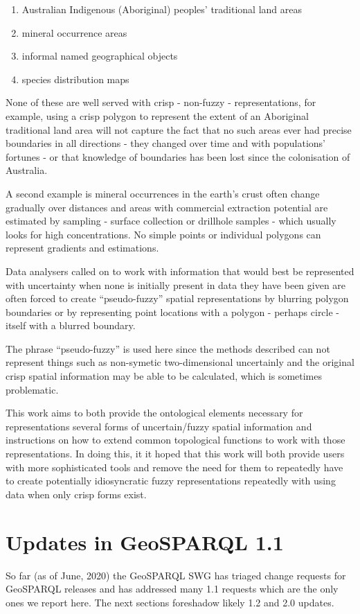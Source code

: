 \documentclass[runningheads]{llncs}
\begin{document}
\begin{enumerate}
    \item Australian Indigenous (Aboriginal) peoples' traditional land areas
    \item mineral occurrence areas
    \item informal named geographical objects
    \item species distribution maps
\end{enumerate}

None of these are well served with crisp - non-fuzzy - representations, for example, using a crisp polygon to represent the extent of an Aboriginal traditional land area will not capture the fact that no such areas ever had precise boundaries in all directions - they changed over time and with populations' fortunes - or that knowledge of boundaries has been lost since the colonisation of Australia.

A second example is mineral occurrences in the earth's crust often change gradually over distances and areas with commercial extraction potential are estimated by sampling - surface collection or drillhole samples - which usually looks for high concentrations. No simple points or individual polygons can represent gradients and estimations.

Data analysers called on to work with information that would best be represented with uncertainty when none is initially present in data they have been given are often forced to create ``pseudo-fuzzy'' spatial representations by blurring polygon boundaries or by representing point locations with a polygon - perhaps circle - itself with a blurred boundary.

The phrase ``pseudo-fuzzy'' is used here since the methods described can not represent things such as non-symetic two-dimensional uncertainly and the original crisp spatial information may be able to be calculated, which is sometimes problematic.

This work aims to both provide the ontological elements necessary for representations several forms of uncertain/fuzzy spatial information and instructions on how to extend common topological functions to work with those representations. In doing this, it it hoped that this work will both provide users with more sophisticated tools and remove the need for them to repeatedly have to create potentially idiosyncratic fuzzy representations repeatedly with using data when only crisp forms exist.


\section{Updates in GeoSPARQL 1.1}\label{sec:newfeatures}
So far (as of June, 2020) the GeoSPARQL SWG has triaged change requests for GeoSPARQL releases and has addressed
many 1.1 requests which are the only ones we report here. The next sections foreshadow likely 1.2 and 2.0 updates.
\end{document}
